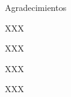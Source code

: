 %
%
%
%

\thispagestyle{empty}

{\flushright

	\begin{LARGE}
		Agradecimientos
	\end{LARGE}

	\hspace{3mm}

	\begin{large}

		\hspace{3mm}
		XXX
	
		\hspace{3mm}
		XXX
	
		\hspace{3mm}
		XXX
	
		\hspace{3mm}
		XXX

	\end{large}

}